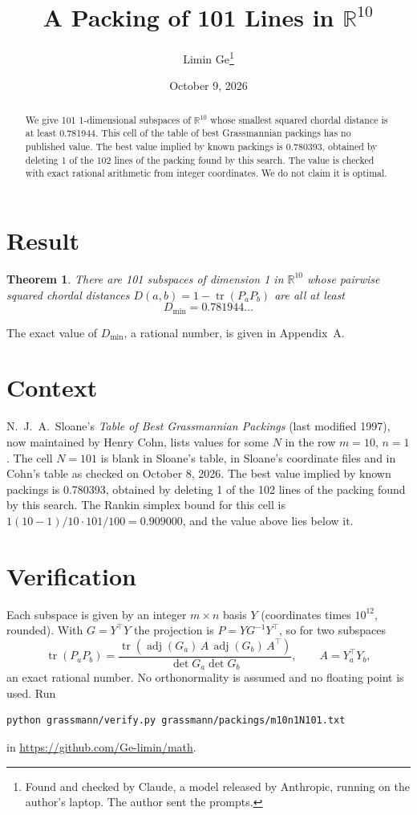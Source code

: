 \documentclass[11pt,a4paper]{article}
\title{A Packing of 101 Lines in $\mathbb{R}^{10}$}
\author{Limin Ge\thanks{Found and checked by Claude, a model released by Anthropic, running on the author's laptop. The author sent the prompts.}}
\date{October 9, 2026}
\newtheorem*{theorem}{Theorem}
\begin{document}
\maketitle
\begin{abstract}
We give 101 1-dimensional subspaces of $\mathbb{R}^{10}$ whose smallest squared chordal distance is at least 0.781944. This cell of the table of best Grassmannian packings has no published value. The best value implied by known packings is 0.780393, obtained by deleting 1 of the 102 lines of the packing found by this search. The value is checked with exact rational arithmetic from integer coordinates. We do not claim it is optimal.
\end{abstract}

\section{Result}
\begin{theorem}
There are 101 subspaces of dimension 1 in $\mathbb{R}^{10}$ whose pairwise squared chordal distances $D(a,b) = 1 - \operatorname{tr}(P_aP_b)$ are all at least
\[ D_{\min} = 0.781944\ldots \]
\end{theorem}
The exact value of $D_{\min}$, a rational number, is given in Appendix~A.


\section{Context}
N.~J.~A.~Sloane's \emph{Table of Best Grassmannian Packings} (last modified 1997), now maintained by Henry Cohn, lists values for some $N$ in the row $m=10$, $n=1$. The cell $N=101$ is blank in Sloane's table, in Sloane's coordinate files and in Cohn's table as checked on October 8, 2026. The best value implied by known packings is 0.780393, obtained by deleting 1 of the 102 lines of the packing found by this search. The Rankin simplex bound for this cell is $1(10-1)/10\cdot 101/100 = 0.909000$, and the value above lies below it.


\section{Verification}
Each subspace is given by an integer $m\times n$ basis $Y$ (coordinates times $10^{12}$, rounded). With $G=Y^\top Y$ the projection is $P=YG^{-1}Y^\top$, so for two subspaces
\[ \operatorname{tr}(P_aP_b)=\frac{\operatorname{tr}(\operatorname{adj}(G_a)\,A\,\operatorname{adj}(G_b)\,A^\top)}{\det G_a\det G_b},\qquad A=Y_a^\top Y_b, \]
an exact rational number. No orthonormality is assumed and no floating point is used. Run
\begin{verbatim}
python grassmann/verify.py grassmann/packings/m10n1N101.txt
\end{verbatim}
in \url{https://github.com/Ge-limin/math}.
\end{document}
